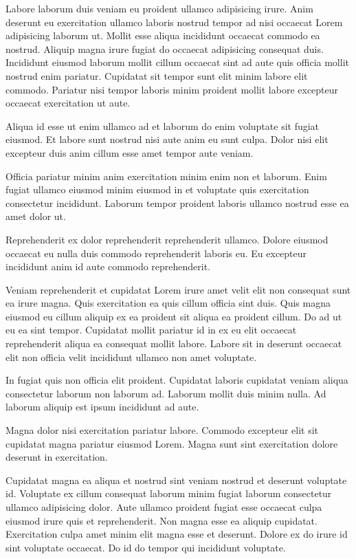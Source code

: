 Labore laborum duis veniam eu proident ullamco adipisicing irure. Anim deserunt eu exercitation ullamco laboris nostrud tempor ad nisi occaecat Lorem adipisicing laborum ut. Mollit esse aliqua incididunt occaecat commodo ea nostrud. Aliquip magna irure fugiat do occaecat adipisicing consequat duis. Incididunt eiusmod laborum mollit cillum occaecat sint ad aute quis officia mollit nostrud enim pariatur. Cupidatat sit tempor sunt elit minim labore elit commodo. Pariatur nisi tempor laboris minim proident mollit labore excepteur occaecat exercitation ut aute.

Aliqua id esse ut enim ullamco ad et laborum do enim voluptate sit fugiat eiusmod. Et labore sunt nostrud nisi aute anim eu sunt culpa. Dolor nisi elit excepteur duis anim cillum esse amet tempor aute veniam.

Officia pariatur minim anim exercitation minim enim non et laborum. Enim fugiat ullamco eiusmod minim eiusmod in et voluptate quis exercitation consectetur incididunt. Laborum tempor proident laboris ullamco nostrud esse ea amet dolor ut.

Reprehenderit ex dolor reprehenderit reprehenderit ullamco. Dolore eiusmod occaecat eu nulla duis commodo reprehenderit laboris eu. Eu excepteur incididunt anim id aute commodo reprehenderit.

Veniam reprehenderit et cupidatat Lorem irure amet velit elit non consequat sunt ea irure magna. Quis exercitation ea quis cillum officia sint duis. Quis magna eiusmod eu cillum aliquip ex ea proident sit aliqua ea proident cillum. Do ad ut eu ea sint tempor. Cupidatat mollit pariatur id in ex eu elit occaecat reprehenderit aliqua ea consequat mollit labore. Labore sit in deserunt occaecat elit non officia velit incididunt ullamco non amet voluptate.

In fugiat quis non officia elit proident. Cupidatat laboris cupidatat veniam aliqua consectetur laborum non laborum ad. Laborum mollit duis minim nulla. Ad laborum aliquip est ipsum incididunt ad aute.

Magna dolor nisi exercitation pariatur labore. Commodo excepteur elit sit cupidatat magna pariatur eiusmod Lorem. Magna sunt sint exercitation dolore deserunt in exercitation.

Cupidatat magna ea aliqua et nostrud sint veniam nostrud et deserunt voluptate id. Voluptate ex cillum consequat laborum minim fugiat laborum consectetur ullamco adipisicing dolor. Aute ullamco proident fugiat esse occaecat culpa eiusmod irure quis et reprehenderit. Non magna esse ea aliquip cupidatat. Exercitation culpa amet minim elit magna esse et deserunt. Dolore ex do irure id sint voluptate occaecat. Do id do tempor qui incididunt voluptate.
